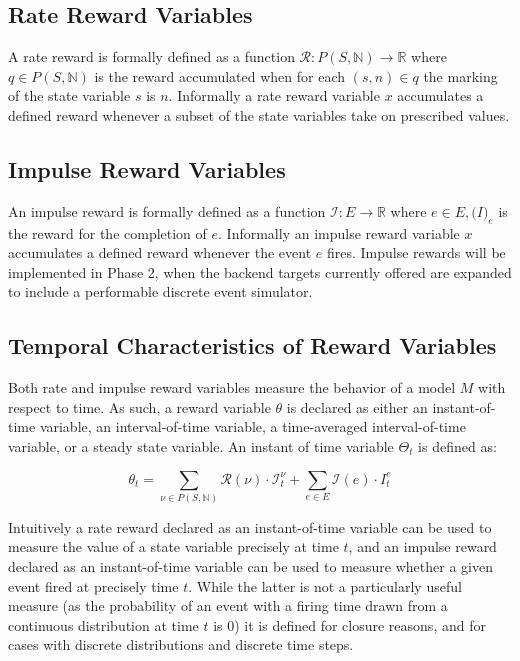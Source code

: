 \documentclass[11pt]{article}
\begin{document}
\subsection{Rate Reward Variables}

A rate reward is formally defined as a function $\mathcal{R}: P(S, \mathbb{N}) \rightarrow \mathbb{R}$ where $q \in P(S, \mathbb{N})$ is the reward accumulated when for each $(s,n) \in q$ the marking of the state variable $s$ is $n$.  Informally a rate reward variable $x$ accumulates a defined reward whenever a subset of the state variables take on prescribed values.

\subsection{Impulse Reward Variables}

An impulse reward is formally defined as a function $\mathcal{I}: E \rightarrow \mathbb{R}$ where $e \in E, \mathcal(I)_e$ is the reward for the completion of $e$.  Informally an impulse reward variable $x$ accumulates a defined reward whenever the event $e$ fires. Impulse rewards will be implemented in Phase 2, when the backend targets currently offered are expanded to include a performable discrete event simulator.

\subsection{Temporal Characteristics of Reward Variables}

Both rate and impulse reward variables measure the behavior of a model $M$ with respect to time.  As such, a reward variable $\theta$ is declared as either an instant-of-time variable, an interval-of-time variable, a time-averaged interval-of-time variable, or a steady state variable.  An instant of time variable $\Theta_t$ is defined as:

\[ \theta_t = \sum_{\nu \in P(S, \mathbb{N})} \mathcal{R}(\nu) \cdot \mathcal{I}^{\nu}_t + \sum_{e \in E} \mathcal{I}(e) \cdot I_t^e\]

Intuitively a rate reward declared as an instant-of-time variable \cite{freire1990technique} can be used to measure the value of a state variable precisely at time $t$, and an impulse reward declared as an instant-of-time variable can be used to measure whether a given event fired at precisely time $t$.  While the latter is not a particularly useful measure (as the probability of an event with a firing time drawn from a continuous distribution at time $t$ is $0$) it is defined for closure reasons, and for cases with discrete distributions and discrete time steps.
\end{document}
